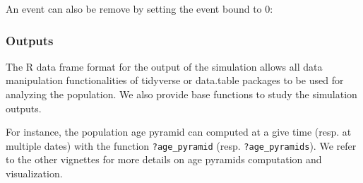 An event can also be remove by setting the event bound to 0:

\begin{Shaded}
\begin{Highlighting}[]
\StringTok{ }
     \NormalTok{(}\NormalTok{ =}\StringTok{ }\NormalTok{, }\NormalTok{ =}\StringTok{ }\OperatorTok{*}\NormalTok{(}\OperatorTok{*}
 \NormalTok{)}
\end{Highlighting}
\end{Shaded}

\hypertarget{outputs}{%
\subsubsection{Outputs}\label{outputs}}

The R data frame format for the output of the simulation allows all data manipulation functionalities of tidyverse or data.table packages to be used for analyzing the population. We also provide base functions to study the simulation outputs.

For instance, the population age pyramid can computed at a give time (resp. at multiple dates) with the function \texttt{?age\_pyramid} (resp. \texttt{?age\_pyramids}). We refer to the other vignettes for more details on age pyramids computation and visualization.

\begin{Shaded}
\begin{Highlighting}[]
\StringTok{ }\OperatorTok{$}

\StringTok{ } \OperatorTok{:} \NormalTok{)}
\end{Highlighting}
\end{Shaded}

